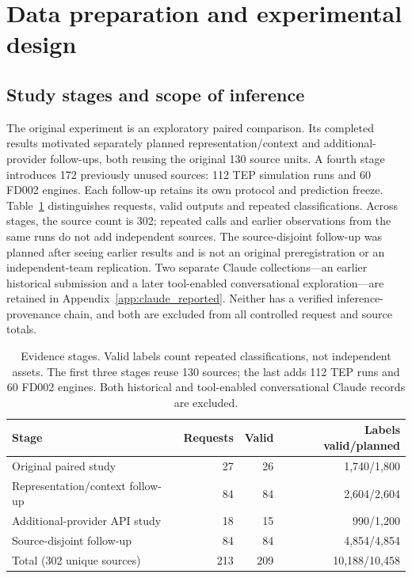 \documentclass[11pt,a4paper]{article}
\begin{document}
\section{Data preparation and experimental design}
\subsection{Study stages and scope of inference}
The original experiment is an exploratory paired comparison. Its completed results motivated separately planned representation/context and additional-provider follow-ups, both reusing the original 130 source units. A fourth stage introduces 172 previously unused sources: 112 TEP simulation runs and 60 FD002 engines. Each follow-up retains its own protocol and prediction freeze. Table~\ref{tab:stages} distinguishes requests, valid outputs and repeated classifications. Across stages, the source count is 302; repeated calls and earlier observations from the same runs do not add independent sources. The source-disjoint follow-up was planned after seeing earlier results and is not an original preregistration or an independent-team replication. Two separate Claude collections---an earlier historical submission and a later tool-enabled conversational exploration---are retained in Appendix~\ref{app:claude_reported}. Neither has a verified inference-provenance chain, and both are excluded from all controlled request and source totals.

\begin{table}[htbp]
\centering
\small
\caption{Evidence stages. Valid labels count repeated classifications, not independent assets. The first three stages reuse 130 sources; the last adds 112 TEP runs and 60 FD002 engines. Both historical and tool-enabled conversational Claude records are excluded.}
\label{tab:stages}
\begin{tabular}{@{}lrrr@{}}
\toprule
Stage & Requests & Valid & Labels valid/planned \\
\midrule
Original paired study & 27 & 26 & 1,740/1,800 \\
Representation/context follow-up & 84 & 84 & 2,604/2,604 \\
Additional-provider API study & 18 & 15 & 990/1,200 \\
Source-disjoint follow-up & 84 & 84 & 4,854/4,854 \\
Total (302 unique sources) & 213 & 209 & 10,188/10,458 \\
\bottomrule
\end{tabular}
\end{table}
\end{document}
